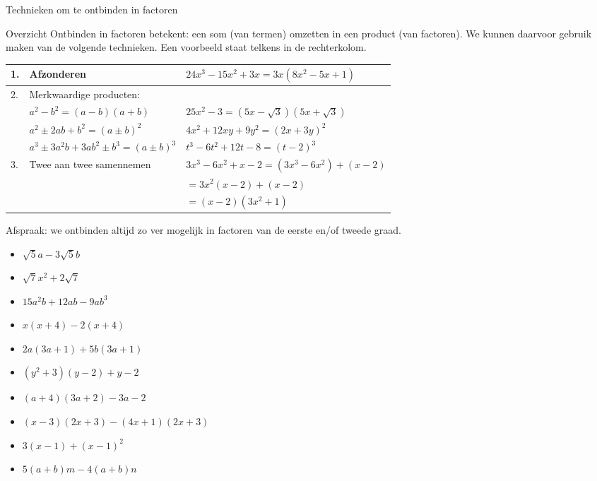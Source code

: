 \begin{lesactiviteit}{Technieken om te ontbinden in factoren}

\begin{kader}{}{Overzicht}
		Ontbinden in factoren betekent: een som (van termen) omzetten in een product (van factoren). We kunnen daarvoor gebruik maken van de volgende technieken. Een voorbeeld staat telkens in de rechterkolom.
  \begin{tabel}
	\begin{tabular}{l l|l}
    \rowcolor{\rubriekkleur!10} 1. &  Afzonderen & $24x^3-15x^2+3x=3x(8x^2-5x+1)$\\
    \hline
    \rowcolor{\rubriekkleur!10} 2. &  Merkwaardige producten: & \\
    \rowcolor{\rubriekkleur!10} & $a^2-b^2=(a-b)(a+b)$ & $25x^2-3=(5x-\sqrt{3})(5x+\sqrt{3})$\\
    \rowcolor{\rubriekkleur!10} & $a^2\pm 2ab + b^2 = (a\pm b)^2$ & $4x^2+12xy+9y^2=(2x+3y)^2$\\
    \rowcolor{\rubriekkleur!10} & $a^3 \pm 3a^2b +3ab^2 \pm b^3 = (a \pm b)^3$ & $t^3-6t^2+12t-8=(t-2)^3$\\
    \hline
    \rowcolor{\rubriekkleur!10} 3. & Twee aan twee samennemen & $3x^3-6x^2 +x-2=(3x^3-6x^2)+(x-2)$\\
    \rowcolor{\rubriekkleur!10} & & \phantom{$3x^3-6x^2 +x-2$} $=3x^2(x-2)+(x-2)$\\
    \rowcolor{\rubriekkleur!10} & & \phantom{$3x^3-6x^2 +x-2$} $=(x-2)(3x^2+1)$\\
 \end{tabular}
 \end{tabel}
        Afspraak: we ontbinden altijd zo ver mogelijk in factoren van de eerste en/of tweede graad.
\end{kader}

\begin{vraagenantwoord}
    \begin{multicols}{2}
        
    \begin{itemize}[label=\textcolor{\rubriekkleur}{\Large\textbullet}]
        \item {$\sqrt{5} a-3 \sqrt{5} b$}
        \item {$\sqrt{7}x^2+2\sqrt{7}$}
        \item {$15a^2b+12ab-9ab^3$}
        \item {$x(x+4)-2(x+4)$}
        \item {$2a(3a+1)+5b(3a+1)$}
        \item {$(y^2+3)(y-2)+y-2$}
        \item {$(a+4)(3a+2)-3a-2$}
        \item {$(x-3)(2x+3)-(4x+1)(2x+3)$}
        \item {$3(x-1)+(x-1)^2$}
        \item {$5(a+b)m-4(a+b)n$}
    \end{itemize}


\end{multicols}
\end{vraagenantwoord}
\end{lesactiviteit}
